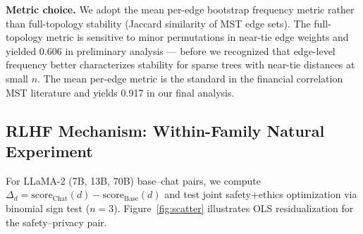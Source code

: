 \textbf{Metric choice.} We adopt the mean per-edge bootstrap frequency metric \cite{tumminello2005tool} rather than full-topology stability (Jaccard similarity of MST edge sets). The full-topology metric is sensitive to minor permutations in near-tie edge weights and yielded 0.606 in preliminary analysis --- before we recognized that edge-level frequency better characterizes stability for sparse trees with near-tie distances at small $n$. The mean per-edge metric is the standard in the financial correlation MST literature \cite{tumminello2005tool} and yields 0.917 in our final analysis.

\subsection{RLHF Mechanism: Within-Family Natural Experiment}

For LLaMA-2 (7B, 13B, 70B) base--chat pairs, we compute $\Delta_d = \text{score}_\text{Chat}(d) - \text{score}_\text{Base}(d)$ and test joint safety+ethics optimization via binomial sign test ($n = 3$). Figure~\ref{fig:scatter} illustrates OLS residualization for the safety--privacy pair.
